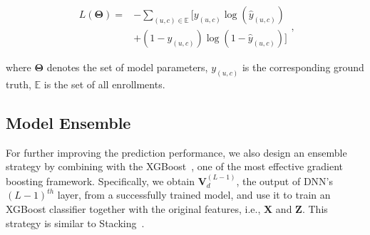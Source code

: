 \begin{equation}
\begin{split}
L(\mathbf{\Theta}) =  &-\sum_{(u,c)\in \mathbb{E}} [y_{(u,c)}\log(\hat{y}_{(u,c)}) \\
             &+(1-y_{(u,c)})\log(1-\hat{y}_{(u,c)})]
\end{split},
\end{equation}

\noindent where $\mathbf{\Theta}$ denotes the set of model parameters, $y_{(u,c)}$ is the corresponding ground truth, $\mathbb{E}$ is the set of all enrollments.



\subsection{Model Ensemble}
\label{sec:ensem}
For further improving the prediction performance, we also design an ensemble strategy by combining \modelname{} with the XGBoost~\cite{Chen:2016:XST:2939672.2939785}, one of the most effective gradient boosting framework. Specifically, we obtain $\mathbf{V}_{d}^{(L-1)}$, the output of DNN's $(L-1)^{th}$ layer, from a successfully trained \modelname{} model, and use it to train an XGBoost classifier together with the  original features, i.e., $\mathbf{X}$ and $\mathbf{Z}$. This strategy is similar to  Stacking~\cite{wolpert1992stacked}.

